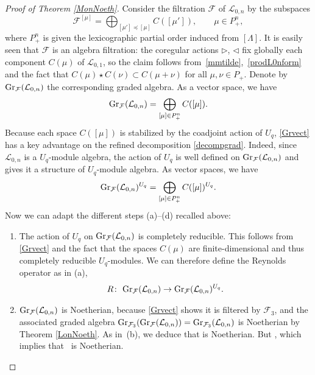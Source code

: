 \documentclass[pdftex]{sigma}
\numberwithin{equation}{section}
\theoremstyle{definition}
\newcommand{\Ff}{{\mathcal F}}
\newcommand{\Ll}{{\mathcal L}}
\newcommand{\ra}{\rightarrow}
\begin{document}
\begin{proof}[Proof of Theorem \ref{MonNoeth}] Consider the filtration $\Ff$ of ${\mathcal L}_{0,n}$ by the subspaces
\[{\mathcal F}^{[\mu]} =\bigoplus_{[\mu']\preceq [\mu]} C([\mu']), \qquad \mu\in P_+^n,\]
where $P_+^n$ is given the lexicographic partial order induced from $[\Lambda]$. It is easily seen that $\mathcal{F}$ is an algebra filtration: the coregular actions $\rhd$, $\lhd$ fix globally each component $C(\mu)$ of $\Ll_{0,1}$, so the claim follows from~\eqref{mmtilde},~\eqref{prodL0nform} and the fact that $C(\mu)\star C(\nu) \subset C(\mu+\nu)$ for all $\mu,\nu\in P_+$. Denote by ${\rm Gr}_{\mathcal F}({\mathcal L}_{0,n})$ the corresponding graded algebra. As a vector space, we have
\begin{equation}\label{Grvect}
{\rm Gr}_{{\mathcal F}}({\mathcal L}_{0,n})= \bigoplus_{[\mu]\in P_+^n} C([\mu]).
\end{equation}
Because each space $C([\mu])$ is stabilized by the coadjoint action of $U_q$, \eqref{Grvect} has a key advantage on the refined decomposition \eqref{decompgrad}. Indeed, since ${\mathcal L}_{0,n}$ is a $U_q$-module algebra, the action of $U_q$ is well defined on ${\rm Gr}_{\mathcal F}({\mathcal L}_{0,n})$ and gives it a structure of $U_q$-module algebra. As vector spaces, we have
\[%
{\rm Gr}_{{\mathcal F}}({\mathcal L}_{0,n})^{U_q}=\bigoplus_{[\mu]\in P_+^n} C([\mu])^{U_q}.%
\]
Now we can adapt the different steps (a)--(d) recalled above:
\begin{enumerate}\itemsep=0pt %
\item[(a$'$)] The action of $U_q$ on ${\rm Gr}_{\mathcal F}({\mathcal L}_{0,n})$ is completely reducible. This follows from \eqref{Grvect} and the fact that the spaces $C(\mu)$ are finite-dimensional and thus completely reducible $U_q$-modules. We can therefore define the Reynolds operator as in (a),
\[R\colon\ {\rm Gr}_{{\mathcal F}}({\mathcal L}_{0,n})\ra {\rm Gr}_{{\mathcal F}}({\mathcal L}_{0,n})^{U_q}.\]
\item[(b$'$)] ${\rm Gr}_{{\mathcal F}}({\mathcal L}_{0,n})$ is Noetherian, because \eqref{Grvect} shows it is filtered by ${\mathcal F}_3$, and the associated graded algebra ${\rm Gr}_{{\mathcal F}_3}({\rm Gr}_{{\mathcal F}}({\mathcal L}_{0,n}))={\rm Gr}_{{\mathcal F}_3}({\mathcal L}_{0,n})$ is Noetherian by Theorem \ref{LonNoeth}. As in~(b), we deduce that  is Noetherian. But , which implies that~ is Noetherian.

\end{enumerate}
\end{proof}
\end{document}
